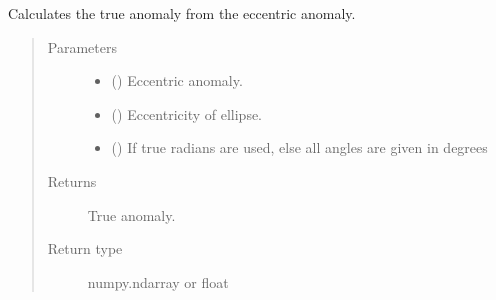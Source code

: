 \documentclass[letterpaper,10pt,english]{sphinxmanual}
\begin{document}

\begin{fulllineitems}
\label{\detokenize{modules/dpt_tools:dpt_tools.eccentric2true}}
Calculates the true anomaly from the eccentric anomaly.
\begin{quote}\begin{description}
\item[{Parameters}] \leavevmode\begin{itemize}
\item {} 
 () \textendash{} Eccentric anomaly.

\item {} 
 () \textendash{} Eccentricity of ellipse.

\item {} 
 () \textendash{} If true radians are used, else all angles are given in degrees

\end{itemize}

\item[{Returns}] \leavevmode
True anomaly.

\item[{Return type}] \leavevmode
numpy.ndarray or float

\end{description}\end{quote}

\end{fulllineitems}

\end{document}
